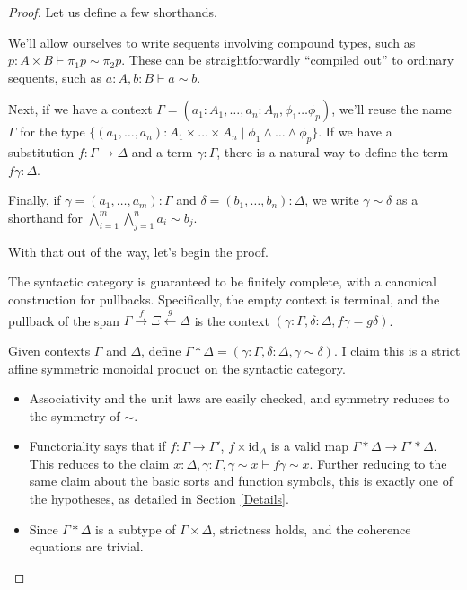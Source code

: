 \documentclass{article}
\begin{document}
\begin{proof}
    Let us define a few shorthands.

    We'll allow ourselves to write sequents involving compound types, such as \(p : A \times B \vdash \pi_1 p \sim \pi_2 p\).
    These can be straightforwardly ``compiled out'' to ordinary sequents, such as \(a : A, b : B \vdash a \sim b\).

    Next, if we have a context \(\Gamma = (a_1 : A_1, \dots, a_n : A_n, \phi_1 \dots \phi_p)\),
    we'll reuse the name \(\Gamma\) for the type \(\{(a_1, \dots, a_n) : A_1 \times \dots \times A_n \mid \phi_1 \land \dots \land \phi_p\}\).
    If we have a substitution \(f : \Gamma \to \Delta\) and a term \(\gamma : \Gamma\),
    there is a natural way to define the term \(f\gamma : \Delta\).

    Finally, if \(\gamma = (a_1, \dots, a_m) : \Gamma\) and \(\delta = (b_1, \dots, b_n) : \Delta\),
    we write \(\gamma \sim \delta\) as a shorthand for \(\bigwedge_{i=1}^m \bigwedge_{j=1}^n a_i \sim b_j\).

    With that out of the way, let's begin the proof.

    \pagebreak

    The syntactic category is guaranteed to be finitely complete, with a canonical construction for pullbacks.
    Specifically, the empty context is terminal,
    and the pullback of the span \(\Gamma \xrightarrow{f} \Xi \xleftarrow{g} \Delta\) is the context \((\gamma : \Gamma, \delta : \Delta, f\gamma = g\delta)\).

    Given contexts \(\Gamma\) and \(\Delta\), define \(\Gamma * \Delta = (\gamma : \Gamma, \delta : \Delta, \gamma \sim \delta)\).
    I claim this is a strict affine symmetric monoidal product on the syntactic category.
    \begin{itemize}
        \item Associativity and the unit laws are easily checked, and symmetry reduces to the symmetry of \(\sim\).
        \item Functoriality says that if \(f : \Gamma \to \Gamma'\), \(f \times \mathrm{id}_\Delta\) is a valid map \(\Gamma * \Delta \to \Gamma' * \Delta\).
        This reduces to the claim \(x : \Delta, \gamma : \Gamma, \gamma \sim x \vdash f\gamma \sim x\).
        Further reducing to the same claim about the basic sorts and function symbols, this is exactly one of the hypotheses, as detailed in Section \ref{Details}.
        \item Since \(\Gamma * \Delta\) is a subtype of \(\Gamma \times \Delta\), strictness holds, and the coherence equations are trivial.
    \end{itemize}


\end{proof}
\end{document}
